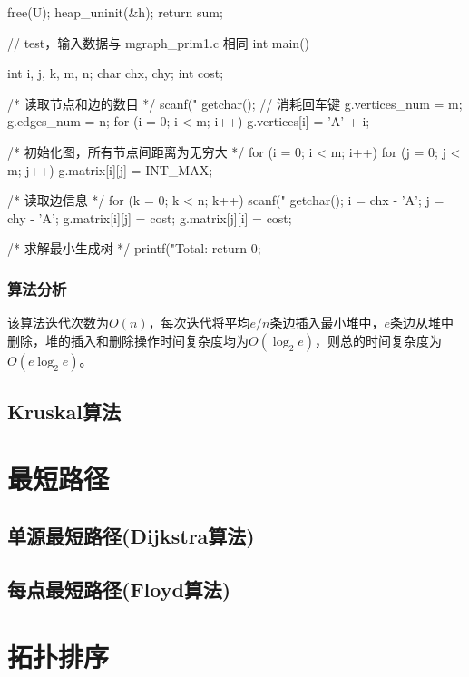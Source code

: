 \begin{Codex}[label=mgraph_prim2.c]
{    free(U);
    heap_uninit(&h);
    return sum;
}


// test，输入数据与 mgraph_prim1.c 相同
int main() {
    int i, j, k, m, n;
    char chx, chy;
    int cost;

    /* 读取节点和边的数目 */
    scanf("%
    getchar(); // 消耗回车键
    g.vertices_num = m;
    g.edges_num = n;
    for (i = 0; i < m; i++) g.vertices[i] = 'A' + i;

    /* 初始化图，所有节点间距离为无穷大 */
    for (i = 0; i < m; i++) {
        for (j = 0; j < m; j++) {
            g.matrix[i][j] = INT_MAX;
        }
    }

    /* 读取边信息 */
    for (k = 0; k < n; k++) {
        scanf("%
        getchar();
        i = chx - 'A';
        j = chy - 'A';
        g.matrix[i][j] = cost;
        g.matrix[j][i] = cost;
    }

    /* 求解最小生成树 */
    printf("Total:%
    return 0;
}
\end{Codex}

\subsubsection{算法分析}
该算法迭代次数为$O(n)$，每次迭代将平均$e/n$条边插入最小堆中，$e$条边从堆中删除，堆的插入和删除操作时间复杂度均为$O(\log_2 e)$，则总的时间复杂度为 $O(e\log_2e)$。

\subsection{Kruskal算法}

\section{最短路径} %

\subsection{单源最短路径(Dijkstra算法)}

\subsection{每点最短路径(Floyd算法)}

\section{拓扑排序} %


